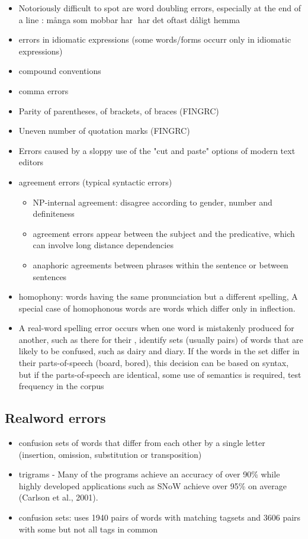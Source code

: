 \documentclass[a4paper,english,12pt]{article}
\begin{document}
\begin{spacing}{1.0}
\begin{itemize}
\item Notoriously difficult to spot are word doubling errors, especially at the end of a line \cite{Vosse1992}: många som mobbar har har det oftast dåligt hemma \cite[p.64]{Sofkova2003}
\item errors in idiomatic expressions (some words/forms occurr only in idiomatic expressions)
\item compound conventions
\item comma errors
\item Parity of parentheses, of brackets, of braces (FINGRC)
\item  Uneven number of quotation marks (FINGRC)
\item Errors caused by a sloppy use of the "cut and paste" options of modern text editors
\item agreement errors (typical syntactic errors) \cite{Vosse1992}
\begin{itemize}
\item NP-internal agreement: disagree according to gender, number and definiteness
\item agreement errors appear between the subject and the predicative, which can involve long distance dependencies
\item anaphoric agreements between phrases within the sentence or between sentences
\end{itemize}
\item homophony: words having the same pronunciation but a different spelling, A special case of homophonous words are words which differ only in inflection.
\item A real-word spelling error occurs when one word is mistakenly produced for another, such as there for their \cite{Pedler2005}, identify sets (usually pairs) of words that are likely to be confused, such as dairy and diary. If the words in the set differ in their parts-of-speech (board, bored), this decision can be based on syntax, but if the parts-of-speech are identical, some use of semantics is required, test frequency in the corpus
\end{itemize}

\subsection{Realword errors}

\begin{itemize}
\item confusion sets of words that differ from each other by a single letter (insertion, omission, substitution or transposition) \cite{Pedler2007}
\item trigrams - Many of the programs achieve an accuracy of over 90\% while highly developed applications
such as SNoW achieve over 95\% on average (Carlson et al., 2001). \cite{Pedler2007}
\item confusion sets: \cite{Pedler2007} uses 1940 pairs of words with matching tagsets and 3606 pairs with some but not all tags in common
\end{itemize}



\end{spacing}
\end{document}
